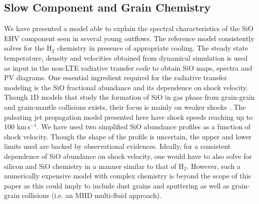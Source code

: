 \documentclass[useAMS,usenatbib]{mn2e}
\begin{document}
\subsection{Slow Component and Grain Chemistry}
%
We have presented a model able to explain the spectral characteristics
of the SiO EHV component seen
in several young outflows. The reference model
consistently solves for the H$_{2}$ chemistry in presence of
appropriate cooling. The steady state temperature, density and velocities obtained from dynamical
simulation is used as input in the non-LTE radiative transfer code to obtain SiO maps, spectra and PV
diagrams. One essential ingredient required for the radiative transfer modeling
is the SiO fractional abundance and its dependence on shock velocity. 
Though 1D models that study the formation of SiO in gas phase from grain-grain and grain-mantle
collisions exists, their focus is mainly on weaker shocks
\citep{Schilke:1997p14140, Caselli:1997p14853, Gusdorf:2008p13800}. 
The pulsating jet propagation model presented here have shock speeds
reaching up to 100 km\,s$^{-1}$. We have used two
simplified SiO abundance profiles as a function of shock
velocity. Though the shape of the profile is uncertain, the upper and
lower limits used are backed by observational evidences. Ideally, for a consistent
dependence of SiO abundance on shock velocity, one would have to also
solve for silicon and SiO chemistry in a manner similar to that of
H$_{2}$. However, such a numerically expensive model 
with complex chemistry is beyond the scope of this paper 
as this could imply to include dust grains and sputtering 
as well as grain-grain collisions (i.e. an MHD multi-fluid approach).  
%
\end{document}
